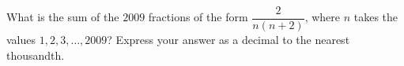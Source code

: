 What is the sum of the $2009$ fractions of the form $\dfrac{2}{n(n+2)}$, where $n$ takes the values $1,2,3,\dots,2009$? Express your answer as a decimal to the nearest thousandth.
